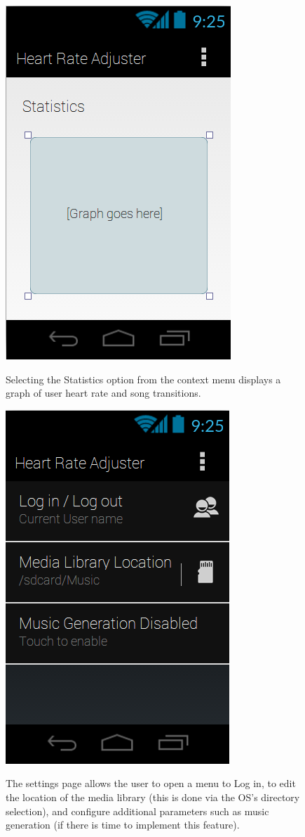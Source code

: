 \documentclass[letterpaper,english, 12pt]{scrreprt}
\begin{document}
\begin{figure}[H]
	\centering
	\includegraphics{img/mobile_ui/7.png}\\
	\caption{Selecting the Statistics option from the context menu displays a graph of user heart rate and song transitions.}
\end{figure}

\begin{figure}[H]
	\centering
	\includegraphics{img/mobile_ui/4.png}\\
	\caption{The settings page allows the user to open a menu to Log in, to edit the location of the media library (this is done via the OS's directory selection), and configure additional parameters such as music generation (if there is time to implement this feature).}
\end{figure}
\end{document}
